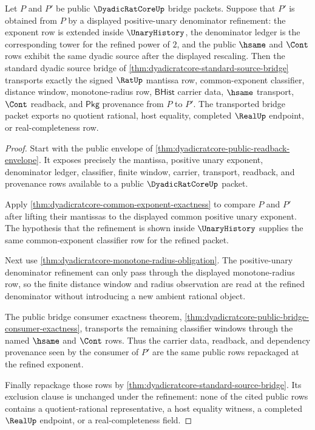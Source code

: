 \begin{theorem}
\label{thm:dyadicratcore-standard-bridge-denominator-refinement-stability}
Let $P$ and $P'$ be public $\DyadicRatCoreUp$ bridge packets. Suppose that
$P'$ is obtained from $P$ by a displayed positive-unary denominator refinement:
the exponent row is extended inside $\UnaryHistory$, the denominator ledger is
the corresponding tower for the refined power of $2$, and the public
$\hsame$ and $\Cont$ rows exhibit the same dyadic source after the displayed
rescaling. Then the standard dyadic source bridge of
\autoref{thm:dyadicratcore-standard-source-bridge} transports exactly the
signed $\RatUp$ mantissa row, common-exponent classifier, distance window,
monotone-radius row, $\mathsf{BHist}$ carrier data, $\hsame$ transport,
$\Cont$ readback, and $\mathsf{Pkg}$ provenance from $P$ to $P'$. The
transported bridge packet exports no quotient rational, host equality,
completed $\RealUp$ endpoint, or real-completeness row.
\end{theorem}
\begin{proof}
Start with the public envelope of
\autoref{thm:dyadicratcore-public-readback-envelope}. It exposes precisely the
mantissa, positive unary exponent, denominator ledger, classifier, finite
window, carrier, transport, readback, and provenance rows available to a
public $\DyadicRatCoreUp$ packet.

Apply \autoref{thm:dyadicratcore-common-exponent-exactness} to compare $P$ and
$P'$ after lifting their mantissas to the displayed common positive unary
exponent. The hypothesis that the refinement is shown inside
$\UnaryHistory$ supplies the same common-exponent classifier row for the
refined packet.

Next use \autoref{thm:dyadicratcore-monotone-radius-obligation}. The
positive-unary denominator refinement can only pass through the displayed
monotone-radius row, so the finite distance window and radius observation are
read at the refined denominator without introducing a new ambient rational
object.

The public bridge consumer exactness theorem,
\autoref{thm:dyadicratcore-public-bridge-consumer-exactness}, transports the
remaining classifier windows through the named $\hsame$ and $\Cont$ rows. Thus
the carrier data, readback, and dependency provenance seen by the consumer of
$P'$ are the same public rows repackaged at the refined exponent.

Finally repackage those rows by
\autoref{thm:dyadicratcore-standard-source-bridge}. Its exclusion clause is
unchanged under the refinement: none of the cited public rows contains a
quotient-rational representative, a host equality witness, a completed
$\RealUp$ endpoint, or a real-completeness field.
\end{proof}

